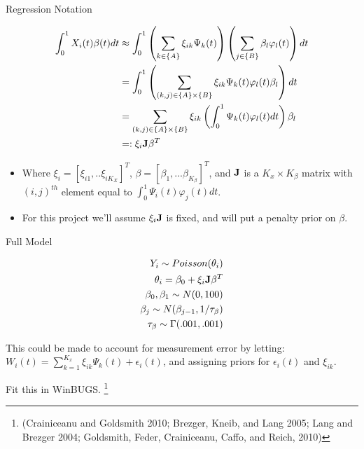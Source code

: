 \documentclass[9 pt]{beamer}
\newcommand{\bi}{\begin{itemize}}
\newcommand{\ei}{\end{itemize}}
\newcommand{\es}[1]{\begin{equation*}\begin{split} #1 \end{split} \end{equation*}}
\begin{document}
\begin{frame}{Regression Notation}

\es{
\int_0^1 X_i(t)\beta(t) dt & \approx \int_0^1 \left( \sum_{k\in \{A\} } \xi_{ik} \Psi_k(t) \right) \left( \sum_{ j\in \{ B\}} \beta_l \varphi_l(t)  \right)dt   \\
 &=\int_0^1 \left(  \sum_{(k,j)\in \{A\}\times \{B\} } \xi_{ik} \Psi_k(t)    \varphi_l(t)   \beta_l \right) dt \\
 &=  \sum_{(k,j)\in \{A\}\times \{B\} } \xi_{ik}  \left( \int_0^1 \Psi_k(t)    \varphi_l(t)  dt \right) \beta_l  \\
 &=: \xi_{i} \bold{J} \beta^T  \\
 }
 
 \bi
\item  Where $\xi_i=[\xi_{i1},..\xi_{iK_X}]^T$, $\beta=[\beta_1,...\beta_{K_\beta}]^T$, and $\bold{J}$ is a $K_x \times K_\beta$ matrix with $(i,j)^{th}$ element equal to $ \int_0^1 \Psi_i(t)    \varphi_j(t) dt$. 
\item For this project we'll assume $\xi_{i} \bold{J}$ is fixed, and will put a penalty prior on $\beta$.
\ei


\end{frame}


\begin{frame}{Full Model}

\es{
Y_i \sim Poisson(\theta_i) \\
 \theta_i  = \beta_0+ \xi_{i} \bold{J} \beta^T  \\
\beta_0, \beta_1 \sim N(0,100) \\
 \beta_j \sim N(\beta_{j-1},1/\tau_\beta) \\
 \tau_\beta \sim \Gamma(.001,.001)\\
 }

This could be made to account for measurement error by letting: $W_i(t)=
\sum_{k=1}^{K_x} \xi_{ik} \Psi_k(t) + \epsilon_i(t)$, and assigning priors for $\epsilon_i(t)$ and $\xi_{ik}$.\vspace{.1cm}


 
 Fit this in WinBUGS. \footnote{(Crainiceanu and Goldsmith 2010; Brezger, Kneib, and Lang 2005; Lang and Brezger 2004; Goldsmith, Feder, Crainiceanu, Caffo, and Reich, 2010)}


\end{frame}
\end{document}
